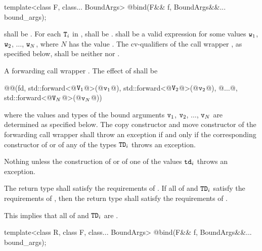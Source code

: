 %
\begin{itemdecl}
template<class F, class... BoundArgs>
  @\unspec@ bind(F&& f, BoundArgs&&... bound_args);
\end{itemdecl}

\begin{itemdescr}
\pnum
\requires
{} shall be . For each $\texttt{T}_i$
in ,  shall be .
 shall be a valid expression for some
values $\texttt{w}_1$, $\texttt{w}_2$, $\dotsc{}$, $\texttt{w}_N$, where
$N$ has the value .
The cv-qualifiers \cv{} of the call wrapper ,
as specified below, shall be neither  nor .

\pnum\returns
A forwarding call wrapper .
The effect of  shall
be
\begin{codeblock}
@@(fd, std::forward<@$\texttt{V}_1$@>(@$\texttt{v}_1$@), std::forward<@$\texttt{V}_2$@>(@$\texttt{v}_2$@), @$\dotsc$@, std::forward<@$\texttt{V}_N$@>(@$\texttt{v}_N$@))
\end{codeblock}
where the values and types of the bound
arguments $\texttt{v}_1$, $\texttt{v}_2$, $\dotsc$, $\texttt{v}_N$ are determined as specified below.
The copy constructor and move constructor of the forwarding call wrapper shall throw an
exception if and only if the corresponding constructor of  or of any of the types
$\texttt{TD}_i$ throws an exception.

\pnum
\throws Nothing unless the construction of
 or of one of the values $\texttt{td}_i$ throws an exception.

\pnum
\remarks The return type shall satisfy the requirements of . If all
of  and $\texttt{TD}_i$ satisfy the requirements of , then the
return type shall satisfy the requirements of . \begin{note} This implies
that all of  and $\texttt{TD}_i$ are . \end{note}
\end{itemdescr}

%
\begin{itemdecl}
template<class R, class F, class... BoundArgs>
  @\unspec@ bind(F&& f, BoundArgs&&... bound_args);
\end{itemdecl}

